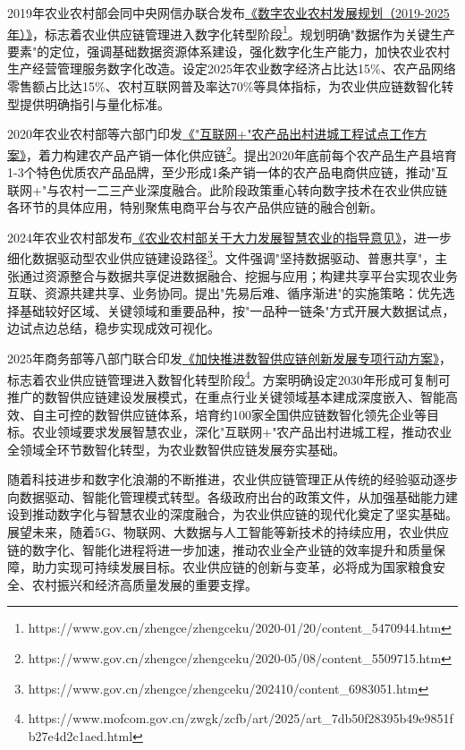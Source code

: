 \documentclass[lang=cn,12pt,a4paper]{elegantpaper}
\begin{document}
2019年农业农村部会同中央网信办联合发布\href{https://www.gov.cn/zhengce/zhengceku/2020-01/20/content_5470944.htm}{《数字农业农村发展规划（2019-2025年）》}，标志着农业供应链管理进入数字化转型阶段\footnote{https://www.gov.cn/zhengce/zhengceku/2020-01/20/content\_5470944.htm}。规划明确"数据作为关键生产要素"的定位，强调基础数据资源体系建设，强化数字化生产能力，加快农业农村生产经营管理服务数字化改造。设定2025年农业数字经济占比达15\%、农产品网络零售额占比达15\%、农村互联网普及率达70\%等具体指标，为农业供应链数智化转型提供明确指引与量化标准。

2020年农业农村部等六部门印发\href{https://www.gov.cn/zhengce/zhengceku/2020-05/08/content_5509715.htm}{《"互联网+"农产品出村进城工程试点工作方案》}，着力构建农产品产销一体化供应链\footnote{https://www.gov.cn/zhengce/zhengceku/2020-05/08/content\_5509715.htm}。提出2020年底前每个农产品生产县培育1-3个特色优质农产品品牌，至少形成1条产销一体的农产品电商供应链，推动"互联网+"与农村一二三产业深度融合。此阶段政策重心转向数字技术在农业供应链各环节的具体应用，特别聚焦电商平台与农产品供应链的融合创新。

2024年农业农村部发布\href{https://www.gov.cn/zhengce/zhengceku/202410/content_6983051.htm}{《农业农村部关于大力发展智慧农业的指导意见》}，进一步细化数据驱动型农业供应链建设路径\footnote{https://www.gov.cn/zhengce/zhengceku/202410/content\_6983051.htm}。文件强调"坚持数据驱动、普惠共享"，主张通过资源整合与数据共享促进数据融合、挖掘与应用；构建共享平台实现农业务互联、资源共建共享、业务协同。提出"先易后难、循序渐进"的实施策略：优先选择基础较好区域、关键领域和重要品种，按"一品种一链条"方式开展大数据试点，边试点边总结，稳步实现成效可视化。

2025年商务部等八部门联合印发\href{https://www.mofcom.gov.cn/zwgk/zcfb/art/2025/art_7db50f28395b49e9851fb27e4d2c1aed.html}{《加快推进数智供应链创新发展专项行动方案》}，标志着农业供应链管理进入数智化转型阶段\footnote{https://www.mofcom.gov.cn/zwgk/zcfb/art/2025/art\_7db50f28395b49e9851fb27e4d2c1aed.html}。方案明确设定2030年形成可复制可推广的数智供应链建设发展模式，在重点行业关键领域基本建成深度嵌入、智能高效、自主可控的数智供应链体系，培育约100家全国供应链数智化领先企业等目标。农业领域要求发展智慧农业，深化"互联网+"农产品出村进城工程，推动农业全领域全环节数智化转型，为农业数智供应链发展夯实基础。

随着科技进步和数字化浪潮的不断推进，农业供应链管理正从传统的经验驱动逐步向数据驱动、智能化管理模式转型。各级政府出台的政策文件，从加强基础能力建设到推动数字化与智慧农业的深度融合，为农业供应链的现代化奠定了坚实基础。展望未来，随着5G、物联网、大数据与人工智能等新技术的持续应用，农业供应链的数字化、智能化进程将进一步加速，推动农业全产业链的效率提升和质量保障，助力实现可持续发展目标。农业供应链的创新与变革，必将成为国家粮食安全、农村振兴和经济高质量发展的重要支撑。
\end{document}
